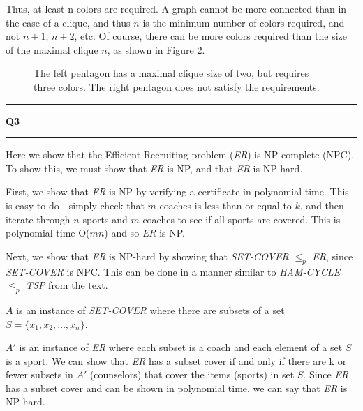 \documentclass[11pt]{article}
\newcommand\question[2]{\vspace{.25in}\hrule\textbf{#1 #2}\vspace{.5em}\hrule\vspace{.10in}}
\begin{document}
Thus, at least n colors are required. A graph cannot be more connected than in the case of a clique, and thus $n$ is the minimum number of colors required, and not $n+1$, $n+2$, etc. Of course, there can be more colors required than the size of the maximal clique $n$, as shown in Figure 2.

\begin{figure}[!htpb]
\centering
{}
\caption{The left pentagon has a maximal clique size of two, but requires three colors. The right pentagon does not satisfy the requirements.}
\end{figure}

\newpage

\question{Q3}{}
Here we show that the Efficient Recruiting problem (\textit{ER}) is NP-complete (NPC). To show this, we must show that \textit{ER} is NP, and that \textit{ER} is NP-hard.

First, we show that \textit{ER} is NP by verifying a certificate in polynomial time. This is easy to do - simply check that $m$ coaches is less than or equal to $k$, and then iterate through $n$ sports and $m$ coaches to see if all sports are covered. This is polynomial time O($mn$) and so \textit{ER} is NP.

Next, we show that \textit{ER} is NP-hard by showing that \textit{SET-COVER} $\leq_p$ \textit{ER}, since \textit{SET-COVER} is NPC. This can be done in a manner similar to \textit{HAM-CYCLE} $\leq_p$ \textit{TSP} from the text.

$A$ is an instance of \textit{SET-COVER} where there are subsets of a set $S=\{x_1,x_2, \dots ,x_n\}$.

$A'$ is an instance of \textit{ER} where each subset is a coach and each element of a set $S$ is a sport. We can show that \textit{ER} has a subset cover if and only if there are k or fewer subsets in $A'$ (counselors) that cover the items (sports) in set $S$. Since \textit{ER} has a subset cover and can be shown in polynomial time, we can say that \textit{ER} is NP-hard. 
\end{document}

